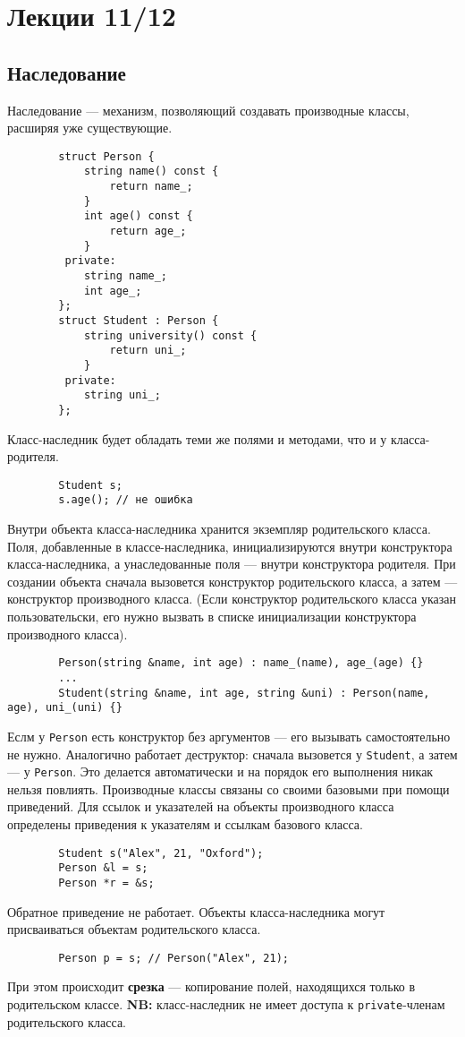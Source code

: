 \documentclass[15pt, a4paper]{article}
\newcommand{\nl}{\newline}
\begin{document}
  \section{Лекции 11/12}
  \subsection{Наследование}
    Наследование --- механизм, позволяющий создавать производные классы, расширяя уже существующие.
    \begin{verbatim}
        struct Person {
            string name() const {
                return name_;
            }
            int age() const {
                return age_;
            }
         private:
            string name_;
            int age_;
        };
        struct Student : Person {
            string university() const {
                return uni_;
            }
         private:
            string uni_;
        };
    \end{verbatim}
    Класс-наследник будет обладать теми же полями и методами, что и у класса-родителя.
    \begin{verbatim}
        Student s;
        s.age(); // не ошибка
    \end{verbatim}
    Внутри объекта класса-наследника хранится экземпляр родительского класса.\nl
    Поля, добавленные в классе-наследника, инициализируются внутри конструктора класса-наследника, а
    унаследованные поля --- внутри конструктора родителя. При создании объекта сначала вызовется
    конструктор родительского класса, а затем --- конструктор производного класса. (Если конструктор 
    родительского класса указан пользовательски, его нужно вызвать в списке инициализации конструктора
    производного класса).
    \begin{verbatim}
        Person(string &name, int age) : name_(name), age_(age) {}
        ...
        Student(string &name, int age, string &uni) : Person(name, age), uni_(uni) {}
    \end{verbatim}
    Еслм у \texttt{Person} есть конструктор без аргументов --- его вызывать самостоятельно не нужно.\nl
    Аналогично работает деструктор: сначала вызовется у \texttt{Student}, а затем --- у \texttt{Person}. Это
    делается автоматически и на порядок его выполнения никак нельзя повлиять.\nl
    Производные классы связаны со своими базовыми при помощи приведений. Для ссылок и указателей на
    объекты производного класса определены приведения к указателям и ссылкам базового класса.\nl
    \begin{verbatim}
        Student s("Alex", 21, "Oxford");
        Person &l = s;
        Person *r = &s;
    \end{verbatim}
    Обратное приведение не работает.\nl
    Объекты класса-наследника могут присваиваться объектам родительского класса.
    \begin{verbatim}
        Person p = s; // Person("Alex", 21);
    \end{verbatim}
    При этом происходит \textbf{срезка} --- копирование полей, находящихся только в родительском классе.\nl
    \textbf{NB:} класс-наследник не имеет доступа к \texttt{private}-членам родительского класса.\nl
\end{document}
